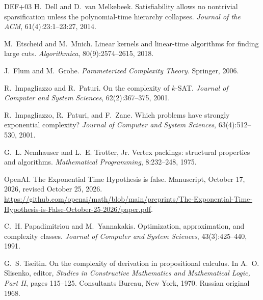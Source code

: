 \documentclass[11pt]{amsart}
\theoremstyle{definition}
\theoremstyle{remark}
\begin{document}
\begin{thebibliography}{DEF+03}
H.~Dell and D.~van Melkebeek.
\newblock Satisfiability allows no nontrivial sparsification unless the polynomial-time hierarchy collapses.
\newblock \emph{Journal of the ACM}, 61(4):23:1--23:27, 2014.

M.~Etscheid and M.~Mnich.
\newblock Linear kernels and linear-time algorithms for finding large cuts.
\newblock \emph{Algorithmica}, 80(9):2574--2615, 2018.

J.~Flum and M.~Grohe.
\newblock \emph{Parameterized Complexity Theory}.
\newblock Springer, 2006.

R.~Impagliazzo and R.~Paturi.
\newblock On the complexity of $k$-SAT.
\newblock \emph{Journal of Computer and System Sciences}, 62(2):367--375, 2001.

R.~Impagliazzo, R.~Paturi, and F.~Zane.
\newblock Which problems have strongly exponential complexity?
\newblock \emph{Journal of Computer and System Sciences}, 63(4):512--530, 2001.

G.~L. Nemhauser and L.~E. Trotter, Jr.
\newblock Vertex packings: structural properties and algorithms.
\newblock \emph{Mathematical Programming}, 8:232--248, 1975.

OpenAI.
\newblock The Exponential Time Hypothesis is false.
\newblock Manuscript, October 17, 2026, revised October 25, 2026. \url{https://github.com/openai/math/blob/main/preprints/The-Exponential-Time-Hypothesis-is-False-October-25-2026/paper.pdf}.

C.~H. Papadimitriou and M.~Yannakakis.
\newblock Optimization, approximation, and complexity classes.
\newblock \emph{Journal of Computer and System Sciences}, 43(3):425--440, 1991.

G.~S. Tseitin.
\newblock On the complexity of derivation in propositional calculus.
\newblock In A.~O. Slisenko, editor, \emph{Studies in Constructive Mathematics and Mathematical Logic, Part II}, pages 115--125. Consultants Bureau, New York, 1970. Russian original 1968.

\end{thebibliography}
\end{document}
